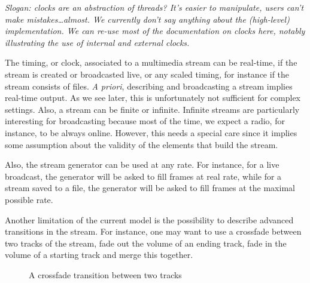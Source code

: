 
\emph{Slogan: clocks are an abstraction of threads?
  It's easier to manipulate, users can't make mistakes\ldots almost.
  We currently don't say anything about the (high-level) implementation.
  We can re-use most of the documentation on clocks here,
  notably illustrating the use of internal and external clocks.}


The timing, or clock, associated to a multimedia stream can be real-time, if the stream is created 
or broadcasted live, or any scaled timing, for instance if the stream consists of files. \textit{A priori},
describing and broadcasting a stream implies real-time output. As we see later, this is unfortunately 
not sufficient for complex settings.
Also, a stream can be finite or infinite. Infinite streams are particularly interesting for broadcasting
because most of the time, we expect a radio, for instance, to be always online. However, this needs 
a special care since it implies some assumption about the validity of the elements that build the stream.

Also, the stream generator can be used at any rate. For instance,
for a live broadcast, the generator will be asked to fill frames at real rate, while 
for a stream saved to a file, the generator will be asked to fill frames at the maximal possible rate.


Another limitation of the current model is the possibility to describe advanced transitions in 
the stream. For instance, one may want to use a crossfade between two tracks 
of the stream, \ie{}
fade out the volume of an ending track, fade in the volume of a starting track and merge this together.

\begin{figure}[t]
 \begin{center}
\end{center}
 \caption{A crossfade transition between two tracks}
 \label{cross-fig}
\end{figure}

